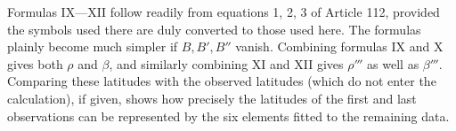 Formulas IX—XII follow readily from equations 1, 2, 3 of Article 112, provided the symbols used there are duly converted to those used here. The formulas plainly become much simpler if $B,B',B''$ vanish. Combining formulas IX and X gives both $\rho$ and $\beta$, and similarly combining XI and XII gives $\rho'''$ as well as $\beta'''$. Comparing these latitudes with the observed latitudes (which do not enter the calculation), if given, shows how precisely the latitudes of the first and last observations can be represented by the six elements fitted to the remaining data.
